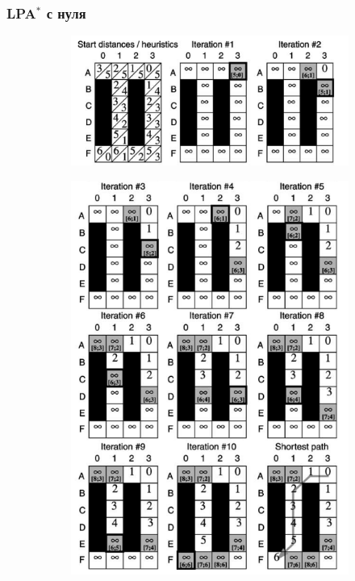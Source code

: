 \documentclass{beamer}
\begin{document}
    \begin{frame}
        \frametitle{LPA$^*$ с нуля}
        \begin{figure}
            \centering
            \begin{subfigure}[b]{0.49\textwidth}
                \centering
                \includegraphics[width=\textwidth]{../figures/rexample-1-1}
                \vspace{4.6cm}
            \end{subfigure}
            \hfill
            \begin{subfigure}[b]{0.49\textwidth}
                \centering
                \includegraphics[width=\textwidth]{../figures/rexample-1-2}
            \end{subfigure}
        \end{figure}

    \end{frame}
\end{document}
